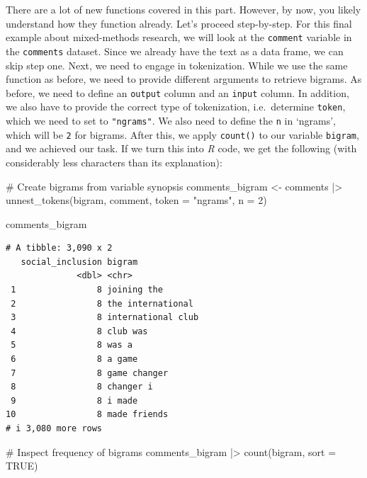 \documentclass[
  letterpaper,
  DIV=11,
  numbers=noendperiod]{scrreprt}
\newenvironment{Shaded}{\begin{snugshade}}{\end{snugshade}}
\newcommand{\AttributeTok}[1]{\textcolor[rgb]{0.40,0.45,0.13}{#1}}
\newcommand{\CommentTok}[1]{\textcolor[rgb]{0.37,0.37,0.37}{#1}}
\newcommand{\ConstantTok}[1]{\textcolor[rgb]{0.56,0.35,0.01}{#1}}
\newcommand{\DecValTok}[1]{\textcolor[rgb]{0.68,0.00,0.00}{#1}}
\newcommand{\FunctionTok}[1]{\textcolor[rgb]{0.28,0.35,0.67}{#1}}
\newcommand{\NormalTok}[1]{\textcolor[rgb]{0.00,0.23,0.31}{#1}}
\newcommand{\OtherTok}[1]{\textcolor[rgb]{0.00,0.23,0.31}{#1}}
\newcommand{\SpecialCharTok}[1]{\textcolor[rgb]{0.37,0.37,0.37}{#1}}
\newcommand{\StringTok}[1]{\textcolor[rgb]{0.13,0.47,0.30}{#1}}
\begin{document}
There are a lot of new functions covered in this part. However, by now,
you likely understand how they function already. Let's proceed
step-by-step. For this final example about mixed-methods research, we
will look at the \texttt{comment} variable in the \texttt{comments}
dataset. Since we already have the text as a data frame, we can skip
step one. Next, we need to engage in tokenization. While we use the same
function as before, we need to provide different arguments to retrieve
bigrams. As before, we need to define an \texttt{output} column and an
\texttt{input} column. In addition, we also have to provide the correct
type of tokenization, i.e.~determine \texttt{token}, which we need to
set to \texttt{"ngrams"}. We also need to define the \texttt{n} in
`ngrams', which will be \texttt{2} for bigrams. After this, we apply
\texttt{count()} to our variable \texttt{bigram}, and we achieved our
task. If we turn this into \emph{R} code, we get the following (with
considerably less characters than its explanation):

\begin{Shaded}
\begin{Highlighting}[]
\CommentTok{\# Create bigrams from variable synopsis}
\NormalTok{comments\_bigram }\OtherTok{\textless{}{-}}
\NormalTok{  comments }\SpecialCharTok{|\textgreater{}}
  \FunctionTok{unnest\_tokens}\NormalTok{(bigram, comment, }\AttributeTok{token =} \StringTok{"ngrams"}\NormalTok{, }\AttributeTok{n =} \DecValTok{2}\NormalTok{)}

\NormalTok{comments\_bigram}
\end{Highlighting}
\end{Shaded}

\begin{verbatim}
# A tibble: 3,090 x 2
   social_inclusion bigram            
              <dbl> <chr>             
 1                8 joining the       
 2                8 the international 
 3                8 international club
 4                8 club was          
 5                8 was a             
 6                8 a game            
 7                8 game changer      
 8                8 changer i         
 9                8 i made            
10                8 made friends      
# i 3,080 more rows
\end{verbatim}

\begin{Shaded}
\begin{Highlighting}[]
\CommentTok{\# Inspect frequency of bigrams}
\NormalTok{comments\_bigram }\SpecialCharTok{|\textgreater{}} \FunctionTok{count}\NormalTok{(bigram, }\AttributeTok{sort =} \ConstantTok{TRUE}\NormalTok{)}
\end{Highlighting}
\end{Shaded}
\end{document}
